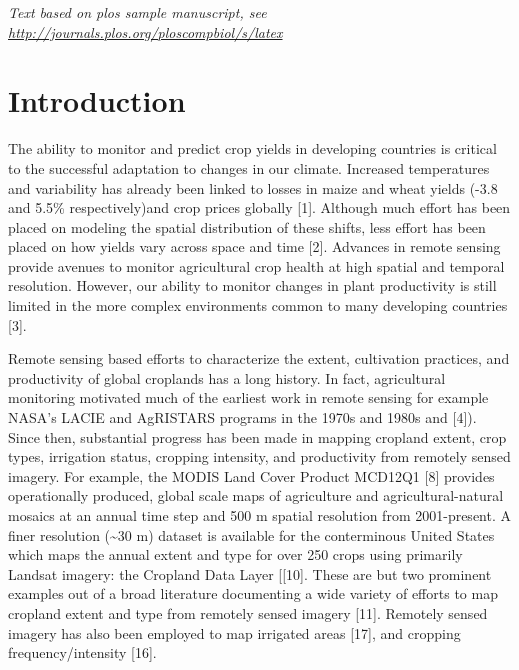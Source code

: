 \documentclass[10pt,letterpaper]{article}
\begin{document}
\linenumbers

\emph{Text based on plos sample manuscript, see
\url{http://journals.plos.org/ploscompbiol/s/latex}}

\section{Introduction}\label{introduction}

The ability to monitor and predict crop yields in developing countries
is critical to the successful adaptation to changes in our climate.
Increased temperatures and variability has already been linked to losses
in maize and wheat yields (-3.8 and 5.5\% respectively)and crop prices
globally {[}1{]}. Although much effort has been placed on modeling the
spatial distribution of these shifts, less effort has been placed on how
yields vary across space and time {[}2{]}. Advances in remote sensing
provide avenues to monitor agricultural crop health at high spatial and
temporal resolution. However, our ability to monitor changes in plant
productivity is still limited in the more complex environments common to
many developing countries {[}3{]}.

Remote sensing based efforts to characterize the extent, cultivation
practices, and productivity of global croplands has a long history. In
fact, agricultural monitoring motivated much of the earliest work in
remote sensing for example NASA's LACIE and AgRISTARS programs in the
1970s and 1980s and {[}4{]}). Since then, substantial progress has been
made in mapping cropland extent, crop types, irrigation status, cropping
intensity, and productivity from remotely sensed imagery. For example,
the MODIS Land Cover Product MCD12Q1 {[}8{]} provides operationally
produced, global scale maps of agriculture and agricultural-natural
mosaics at an annual time step and 500 m spatial resolution from
2001-present. A finer resolution (\textasciitilde{}30 m) dataset is
available for the conterminous United States which maps the annual
extent and type for over 250 crops using primarily Landsat imagery: the
Cropland Data Layer {[}{[}10{]}. These are but two prominent examples
out of a broad literature documenting a wide variety of efforts to map
cropland extent and type from remotely sensed imagery {[}11{]}. Remotely
sensed imagery has also been employed to map irrigated areas {[}17{]},
and cropping frequency/intensity {[}16{]}.
\end{document}
